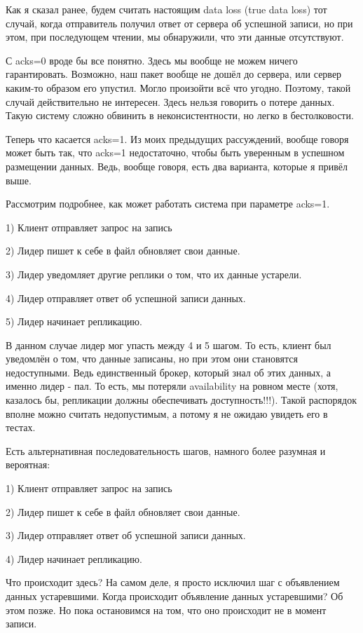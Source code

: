 \documentclass[11pt]{article}
\begin{document}
    Как я сказал ранее, будем считать настоящим data loss (true data loss) тот случай, когда отправитель получил ответ от сервера об успешной записи, но при этом, при последующем чтении, мы обнаружили, что эти данные отсутствуют.

    С acks=0 вроде бы все понятно. Здесь мы вообще не можем ничего гарантировать. Возможно, наш пакет вообще не дошёл до сервера, или сервер каким-то образом его упустил. Могло произойти всё что угодно. Поэтому, такой случай действительно не интересен. Здесь нельзя говорить о потере данных. Такую систему сложно обвинить в неконсистентности, но легко в бестолковости.

    Теперь что касается acks=1. Из моих  предыдущих рассуждений, вообще говоря может быть так, что acks=1 недостаточно, чтобы быть уверенным в успешном размещении данных. Ведь, вообще говоря, есть два варианта, которые я привёл выше.

    Рассмотрим подробнее, как может работать система при параметре acks=1.

    1) Клиент отправляет запрос на запись

    2) Лидер пишет к себе в файл обновляет свои данные.

    3) Лидер уведомляет другие реплики о том, что их данные устарели.

    4) Лидер отправляет ответ об успешной записи данных.

    5) Лидер начинает репликацию.

    В данном случае лидер мог упасть между 4 и 5 шагом. То есть, клиент был уведомлён о том, что данные записаны, но при этом они становятся недоступными. Ведь единственный брокер, который знал об этих данных, а именно лидер - пал. То есть, мы потеряли availability на ровном месте (хотя, казалось бы, репликации должны обеспечивать доступность!!!). Такой распорядок вполне можно считать недопустимым, а потому я не ожидаю увидеть его в тестах.

    Есть альтернативная последовательность шагов, намного более разумная и вероятная:

    1) Клиент отправляет запрос на запись

    2) Лидер пишет к себе в файл обновляет свои данные.

    3) Лидер отправляет ответ об успешной записи данных.

    4) Лидер начинает репликацию.

    Что происходит здесь? На самом деле, я просто исключил шаг с объявлением данных устаревшими. Когда происходит объявление данных устаревшими? Об этом позже. Но пока остановимся на том, что оно происходит не в момент записи.
\end{document}
